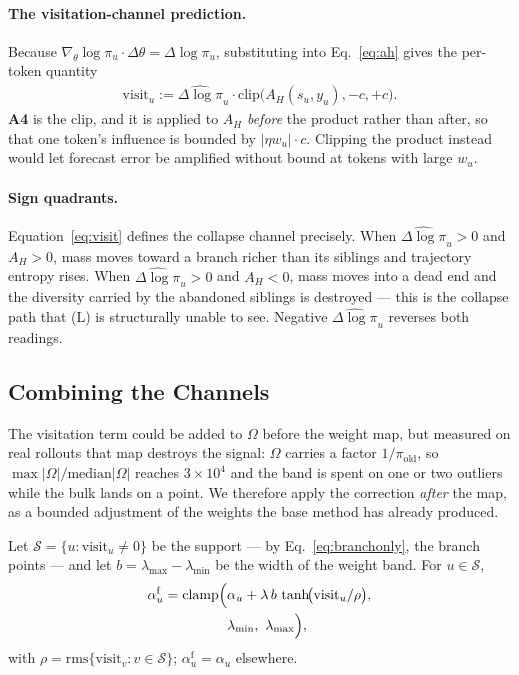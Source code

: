 \documentclass[11pt]{article}
\newcommand{\AH}{A_{H}}
\newcommand{\Om}{\Omega}
\newcommand{\gradt}{\nabla_{\theta}}
\begin{document}
\paragraph{The visitation-channel prediction.}
Because $\gradt \log \pi_u \cdot \Delta\theta = \Delta \log \pi_u$, substituting into
Eq.~\eqref{eq:ah} gives the per-token quantity
%
\begin{equation}
\begin{split}
\mathrm{visit}_u := \widehat{\Delta \log \pi}_u \cdot
\mathrm{clip}\bigl(\AH(s_u,y_u), -c, +c\bigr).
\end{split}
\label{eq:visit}
\end{equation}
%
\textbf{A4} is the clip, and it is applied to $\AH$ \emph{before} the product rather
than after, so that one token's influence is bounded by $|\eta w_u| \cdot c$.
Clipping the product instead would let forecast error be amplified without bound at
tokens with large $w_u$.

\paragraph{Sign quadrants.}
Equation~\eqref{eq:visit} defines the collapse channel precisely.
When $\widehat{\Delta \log \pi}_u > 0$ and $\AH > 0$, mass moves toward a branch
richer than its siblings and trajectory entropy rises. When
$\widehat{\Delta \log \pi}_u > 0$ and $\AH < 0$, mass moves into a dead end and the
diversity carried by the abandoned siblings is destroyed --- this is the collapse
path that (L) is structurally unable to see. Negative
$\widehat{\Delta \log \pi}_u$ reverses both readings.

\subsection{Combining the Channels}
\label{sec:combine}

The visitation term could be added to $\Om$ before the weight map, but measured on
real rollouts that map destroys the signal: $\Om$ carries a factor
$1/\pi_{\mathrm{old}}$, so $\max|\Om| / \mathrm{median}|\Om|$ reaches $3\times10^{4}$
and the band is spent on one or two outliers while the bulk lands on a point. We
therefore apply the correction \emph{after} the map, as a bounded adjustment of the
weights the base method has already produced.

Let $\mathcal{S} = \{u : \mathrm{visit}_u \neq 0\}$ be the support --- by
Eq.~\eqref{eq:branchonly}, the branch points --- and let
$b = \lambda_{\max} - \lambda_{\min}$ be the width of the weight band. For
$u \in \mathcal{S}$,
%
\begin{equation}
\begin{split}
\alpha^{\mathrm{f}}_u = \mathrm{clamp}\Bigl(&\alpha_u
  + \lambda\, b\, \tanh\!\bigl(\mathrm{visit}_u / \rho\bigr),\\
  &\lambda_{\min},\ \lambda_{\max}\Bigr),
\end{split}
\label{eq:combine-app}
\end{equation}
%
with $\rho = \mathrm{rms}\{\mathrm{visit}_v : v \in \mathcal{S}\}$;
$\alpha^{\mathrm{f}}_u = \alpha_u$ elsewhere.
\end{document}
